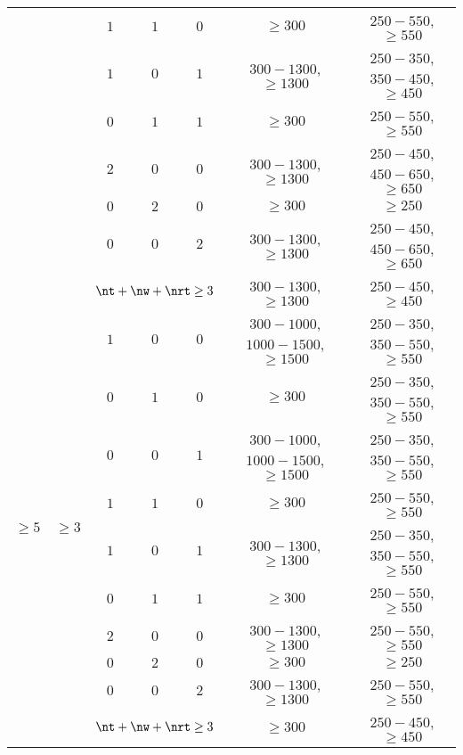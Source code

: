 \begin{table}[!ht]
\begin{center}
{\begin{tabular}{|c|c|c|c|c|c|c|}
						  &					   & $1$	 		 & $1$					& $0$			& $\geq300$ 						& $250-550$, $\geq550$ \\
						  &					   & $1$	 		 & $0$					& $1$	  		& $300-1300$, $\geq1300$ & $250-350$, $350-450$, $\geq450$ \\
						  &					   & $0$			 & $1$					& $1$	  		& $\geq300$							& $250-550$, $\geq550$ \\
						  &					   & $2$	 		 & $0$					& $0$			& $300-1300$, $\geq1300$ & $250-450$, $450-650$, $\geq650$ \\
						  &					   & $0$	 		 & $2$					& $0$	  		& $\geq300$ 						& $\geq250$ \\
						  &					   & $0$			 & $0$					& $2$	  		& $300-1300$, $\geq1300$ & $250-450$, $450-650$, $\geq650$ \\
						  &					   & \multicolumn{3}{|c|}{$\nt+\nw+\nrt\geq3$} & $300-1300$, $\geq1300$ & $250-450$, $\geq450$ \\
	\hline
	\multirow{10}{*}{$\geq5$} & \multirow{10}{*}{$\geq3$} & $1$ & $0$ & $0$ & $300-1000$, $1000-1500$, $\geq1500$ & $250-350$, $350-550$, $\geq550$\\
						  &					   & $0$			 & $1$					& $0$			& $\geq300$ 						& $250-350$, $350-550$, $\geq550$\\
						  &					   & $0$			 & $0$				    & $1$	  		& $300-1000$, $1000-1500$, $\geq1500$ & $250-350$, $350-550$, $\geq550$\\
						  &					   & $1$	 		 & $1$					& $0$			& $\geq300$ 						& $250-550$, $\geq550$ \\
						  &					   & $1$	 		 & $0$					& $1$	  		& $300-1300$, $\geq1300$ & $250-350$, $350-550$, $\geq550$ \\
						  &					   & $0$			 & $1$					& $1$	  		& $\geq300$							& $250-550$, $\geq550$ \\
						  &					   & $2$	 		 & $0$					& $0$			& $300-1300$, $\geq1300$ & $250-550$, $\geq550$ \\
						  &					   & $0$	 		 & $2$					& $0$	  		& $\geq300$ 						& $\geq250$ \\
						  &					   & $0$			 & $0$					& $2$	  		& $300-1300$, $\geq1300$ & $250-550$, $\geq550$ \\
						  &					   & \multicolumn{3}{|c|}{$\nt+\nw+\nrt\geq3$} & $\geq300$ 					   & $250-450$, $\geq450$ \\
	\hline
\end{tabular}
}
\end{center}
\end{table}

